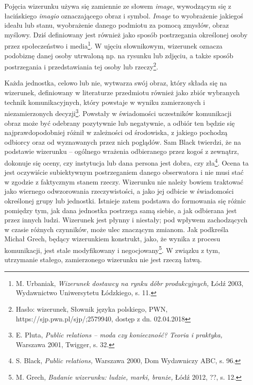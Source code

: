 \documentclass[12pt, a4paper, titlepage]{report}
\begin{document}
Pojęcia wizerunku używa się zamiennie ze słowem \textit{image}, wywodzącym się z łacińskiego \textit{imagio} oznaczającego obraz i symbol. \textit{Image} to wyobrażenie jakiegoś ideału lub stanu, wyobrażenie danego podmiotu za pomocą zmysłów, obraz myślowy. Dziś definiowany jest również jako sposób postrzegania określonej osoby przez społeczeństwo i media\footnote{M. Urbaniak, \textit{Wizerunek dostawcy na rynku dóbr produkcyjnych,} Łódź 2003, Wydawnictwo Uniwersytetu Łódzkiego, s. 11.}. W ujęciu słownikowym, wizerunek oznacza podobiznę danej osoby utrwaloną np. na rysunku lub zdjęciu, a także sposób postrzegania i przedstawiania tej osoby lub rzeczy\footnote{Hasło: wizerunek, Słownik języka polskiego, PWN, https://sjp.pwn.pl/sjp/;2579940, dostęp z dn. 02.04.2018}.

Każda jednostka, celowo lub nie, wytwarza swój obraz, który składa się na wizerunek, definiowany w literaturze przedmiotu również jako zbiór wybranych technik komunikacyjnych, który powstaje w wyniku zamierzonych i niezamierzonych decyzji\footnote{E. Pluta, \textit{Public relations -- moda czy konieczność? Teoria i praktyka,} Warszawa 2001, Twigger, s. 32.}. Powstały w świadomości uczestników komunikacji obraz może być odebrany pozytywnie lub negatywnie, a odbiór ten będzie się najprawdopodobniej różnił w zależności od środowiska, z jakiego pochodzą odbiorcy oraz od wyznawanych przez nich poglądów. Sam Black twierdzi, że na podstawie wizerunku -- ogólnego wrażenia odbieranego przez kogoś z zewnątrz, dokonuje się oceny, czy instytucja lub dana persona jest dobra, czy zła\footnote{S. Black, \textit{Public relations,} Warszawa 2000, Dom Wydawniczy ABC, s. 96.}. Ocena ta jest oczywiście subiektywnym postrzeganiem danego obserwatora i nie musi stać w zgodzie z faktycznym stanem rzeczy. Wizerunku nie należy bowiem traktować jako wiernego odwzorowania rzeczywistości, a jako jej odbicie w świadomości określonej grupy lub jednostki. Istnieje zatem podstawa do formowania się różnic pomiędzy tym, jak dana jednostka postrzega samą siebie, a jak odbierana jest przez innych ludzi. Wizerunek jest płynny i niestały; pod wpływem zachodzących w czasie różnych czynników, może ulec znaczącym zmianom. Jak podkreśla Michał Grech, będący wizerunkiem konstrukt, jako, że wynika z procesu komunikacji, jest stale modyfikowany i negocjowany\footnote{M. Grech, \textit{Badanie wizerunku: ludzie, marki, branże,} Łódź 2012, ??, s. 12.}. W związku z tym, utrzymanie stałego, zamierzonego wizerunku nie jest rzeczą łatwą. 
\end{document}
